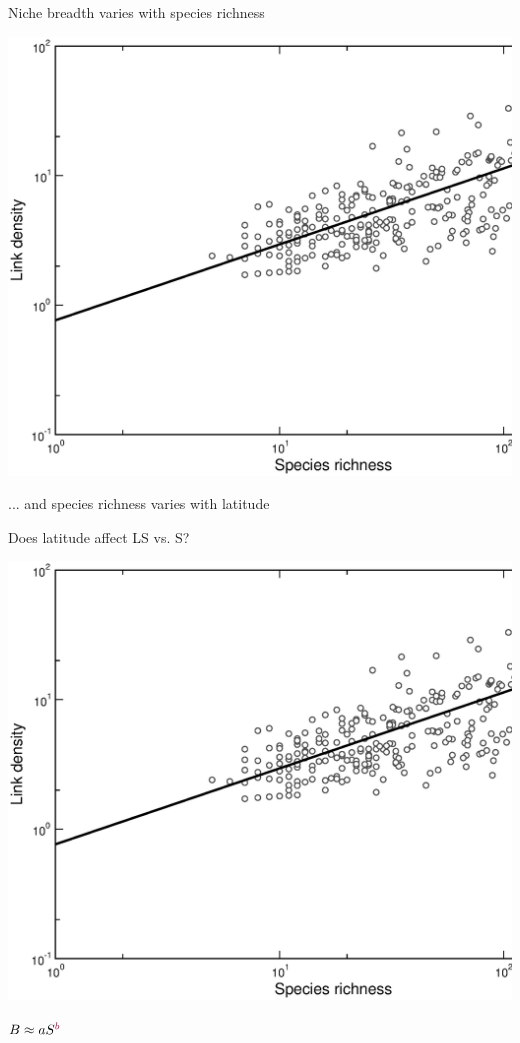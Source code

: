 \documentclass{beamer}
\begin{document}
  \begin{frame}{Niche breadth varies with species richness}

    \begin{center}
      \includegraphics*[width=.8\textwidth]{Figures/results/LS_vs_S_fitline_observed.eps}

      \vspace{.5cm}
    ... and species richness varies with latitude
    \end{center}

  \end{frame}


  \begin{frame}{Does latitude affect LS vs. S?}
    \begin{center}
      \includegraphics*[width=.8\textwidth]{Figures/results/LS_vs_S_fitline_observed.eps}

      \vspace{.5cm}
    \end{center}
    \hspace{1in}
      $B \approx aS^{\color{purple}b}$

  \end{frame}
\end{document}
